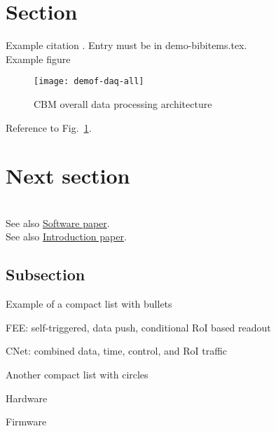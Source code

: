 \section{Section}

Example citation \cite{CBM-stat-rep}. Entry must be in
demo-bibitems.tex.\\ %

Example figure
\begin{figure}[htb]
\centering\texttt{[image: demof-daq-all]} %
\caption{CBM overall data processing architecture}
\label{fig:XXX-fig} %
\end{figure}


Reference to Fig.~\ref{fig:XXX-fig}.
\clearpage %

\section{Next section}

\\
See also \hyperref{http://www-linux.gsi.de/~mbs/main-software.pdf}{sw}{data}{Software paper}.\\
See also \hyperref{http://www-linux.gsi.de/~mbs/main-intro.pdf}{in}{mission}{Introduction paper}.

\subsection{Subsection}

Example of a compact list with bullets
\begin{compactitem}[$\bullet$]
\item FEE: self-triggered, data push, conditional RoI based readout
\item CNet: combined data, time, control, and RoI traffic
\end{compactitem}

Another compact list with circles
\begin{compactitem}[$\circ$]
\item Hardware
\item Firmware
\end{compactitem}
